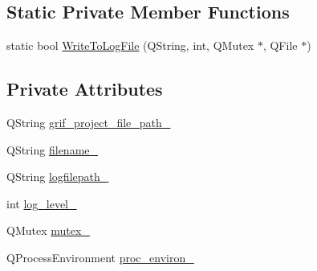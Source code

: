 \subsection*{\-Static \-Private \-Member \-Functions}
\begin{DoxyCompactItemize}
\item 
static bool \hyperlink{classGRILogger_a99d802cf1171ea64c030cfb8769e3905}{\-Write\-To\-Log\-File} (\-Q\-String, int, \-Q\-Mutex $\ast$, \-Q\-File $\ast$)
\end{DoxyCompactItemize}
\subsection*{\-Private \-Attributes}
\begin{DoxyCompactItemize}
\item 
\-Q\-String \hyperlink{classGRILogger_aa1280ba96497c651f21c80929baaa582}{grif\-\_\-project\-\_\-file\-\_\-path\-\_\-}
\item 
\-Q\-String \hyperlink{classGRILogger_aee75dc42ec31c6b8668ba18606c16d1b}{filename\-\_\-}
\item 
\-Q\-String \hyperlink{classGRILogger_aed2b4ca9781c7faf1fce8ee5a4ccc760}{logfilepath\-\_\-}
\item 
int \hyperlink{classGRILogger_acc78c8a84f847872fabee9af161fc4d9}{log\-\_\-level\-\_\-}
\item 
\-Q\-Mutex \hyperlink{classGRILogger_aacbb428753b5108e5608d23bed5ff38d}{mutex\-\_\-}
\item 
\-Q\-Process\-Environment \hyperlink{classGRILogger_aa603a5003a56547f48ef748123aedeec}{proc\-\_\-environ\-\_\-}
\end{DoxyCompactItemize}


